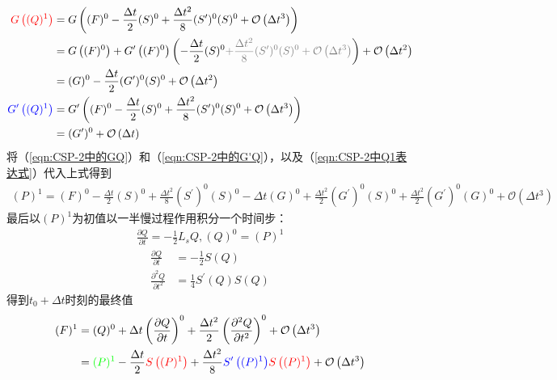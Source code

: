 \documentclass{ctexart}
\begin{document}
\begin{align}
  {\color{red}G\left((Q)^1\right)} & = G\left( (F)^0 - \frac{\Delta{t}}{2} (S)^0 + \frac{\Delta{t}^2}{8} (S^\prime)^0 (S)^0 + \mathcal{O} \left( \Delta{t}^3 \right) \right) \nonumber \\
  & = G\left((F)^0\right) + G^\prime\left((F)^0\right) \left( - \frac{\Delta{t}}{2} (S)^0 {\color{gray} + \frac{\Delta{t}^2}{8} (S^\prime)^0 (S)^0 + \mathcal{O} \left( \Delta{t}^3 \right)} \right) + \mathcal{O} \left( \Delta{t}^2 \right) \nonumber \\
  & = (G)^0 - \frac{\Delta{t}}{2} (G^\prime)^0 (S)^0 + \mathcal{O} \left( \Delta{t}^2 \right) \label{eqn:CSP-2中的GQ} \\
  {\color{blue}G^\prime\left((Q)^1\right)} & = G^\prime \left( (F)^0 - \frac{\Delta{t}}{2} (S)^0 + \frac{\Delta{t}^2}{8} (S^\prime)^0 (S)^0 + \mathcal{O} \left( \Delta{t}^3 \right) \right) \nonumber \\
  & = (G^\prime)^0 + \mathcal{O} \left( \Delta{t} \right) \label{eqn:CSP-2中的G'Q}
\end{align}
将（\ref{eqn:CSP-2中的GQ}）和（\ref{eqn:CSP-2中的G'Q}），以及（\ref{eqn:CSP-2中Q1表达式}）代入上式得到
\begin{align}
  (P)^1 = (F)^0 - \frac{\Delta{t}}{2} (S)^0 + \frac{\Delta{t}^2}{8} (S^\prime)^0 (S)^0 - \Delta{t} (G)^0 + \frac{\Delta{t}^2}{2} (G^\prime)^0 (S)^0  + \frac{\Delta{t}^2}{2} (G^\prime)^0 (G)^0 + \mathcal{O} \left( \Delta{t}^3 \right) \label{eqn:CSP-2中P1表达式}
\end{align}
最后以$(P)^1$为初值以一半慢过程作用积分一个时间步：
\begin{align}
  \frac{\partial Q}{\partial t} = - \frac{1}{2} L_s Q, (Q)^0 = (P)^1
\end{align}
\begin{align*}
  \frac{\partial Q}{\partial t} & = - \frac{1}{2} S(Q) \\
  \frac{\partial^2 Q}{\partial t^2} & = \frac{1}{4} S^\prime(Q) S(Q)
\end{align*}
得到$t_0 + \Delta{t}$时刻的最终值
\begin{align}
  (F)^1 & = (Q)^0 + \Delta{t} \left( \frac{\partial Q}{\partial t} \right)^0 + \frac{\Delta{t}^2}{2} \left( \frac{\partial^2 Q}{\partial t^2} \right)^0 + \mathcal{O} \left( \Delta{t}^3 \right) \nonumber \\
  & = {\color{green}(P)^1} - \frac{\Delta{t}}{2} {\color{red}S\left((P)^1\right)} + \frac{\Delta{t}^2}{8} {\color{blue}S^\prime\left((P)^1\right)} {\color{red}S\left((P)^1\right)} + \mathcal{O} \left( \Delta{t}^3 \right)
\end{align}
\end{document}
